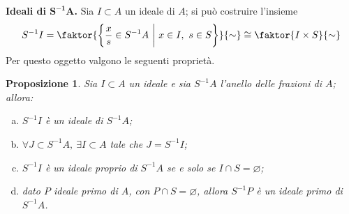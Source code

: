 \documentclass[12pt]{scrartcl}
\theoremstyle{style}
\newtheorem{prop}{Proposizione}[section]
\numberwithin{equation}{subsection}
\begin{document}
\textbf{Ideali di $\mathbf{S^{-1}A} $.} 
Sia $I \subset A$ un ideale di $A$; si pu\`o costruire l'insieme 
\begin{equation}
	S^{-1}I = \faktor{\left\{ \frac{x}{s} \in S^{-1}A \ \bigg\lvert\ x \in I, \ s \in S \right\} }{\sim} \cong \faktor{I \times S}{\sim}
\end{equation}
Per questo oggetto valgono le seguenti propriet\`a.
\begin{prop}
	Sia $I \subset A$ un ideale e sia $S^{-1}A$ l'anello delle frazioni di $A$; allora:
	\begin{enumerate}[(a).]
		\item $S^{-1}I$ \`e un ideale di $S^{-1}A$;
		\item $\forall J \subset S^{-1}A, \ \exists I\subset A$ tale che $J = S^{-1}I$;
		\item $S^{-1}I$ \`e un ideale proprio di $S^{-1}A$ se e solo se $I \cap S = \varnothing$;
		\item dato $P$ ideale primo di $A$, con $P\cap S = \varnothing$, allora $S^{-1}P$ \`e un ideale primo di $S^{-1}A$.
	\end{enumerate}
\end{prop}
\end{document}
